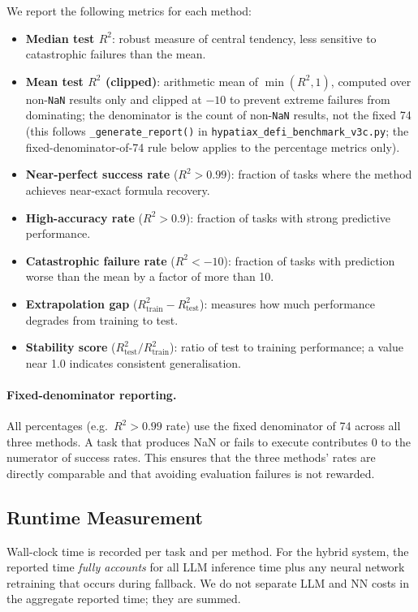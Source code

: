 \documentclass[twoside,11pt]{article}
\newcommand{\Rsq}{R^{2}}
\newcommand{\Rtrain}{R^{2}_{\mathrm{train}}}
\newcommand{\Rtest}{R^{2}_{\mathrm{test}}}
\begin{document}
We report the following metrics for each method:
\begin{itemize}
  \item \textbf{Median test $\Rsq$}: robust measure of central tendency, less
    sensitive to catastrophic failures than the mean.
  \item \textbf{Mean test $\Rsq$ (clipped)}: arithmetic mean of $\min(\Rsq, 1)$,
    computed over non-\texttt{NaN} results only and clipped at $-10$ to prevent extreme failures from
    dominating; the denominator is the count of non-\texttt{NaN} results, not the fixed 74 (this follows
    \texttt{\_generate\_report()} in \texttt{hypatiax\_defi\_benchmark\_v3c.py}; the fixed-denominator-of-74 rule below
    applies to the percentage metrics only).
  \item \textbf{Near-perfect success rate} ($\Rsq > 0.99$): fraction of tasks where
    the method achieves near-exact formula recovery.
  \item \textbf{High-accuracy rate} ($\Rsq > 0.9$): fraction of tasks with strong
    predictive performance.
  \item \textbf{Catastrophic failure rate} ($\Rsq < -10$): fraction of tasks with
    prediction worse than the mean by a factor of more than 10.
  \item \textbf{Extrapolation gap} ($\Rtrain - \Rtest$): measures how much
    performance degrades from training to test.
  \item \textbf{Stability score} ($\Rtest / \Rtrain$): ratio of test to training
    performance; a value near 1.0 indicates consistent generalisation.
\end{itemize}

\paragraph{Fixed-denominator reporting.}
All percentages (e.g.\ $\Rsq > 0.99$ rate) use the fixed denominator of 74 across
all three methods.  A task that produces NaN or fails to execute contributes 0 to
the numerator of success rates.  This ensures that the three methods' rates are
directly comparable and that avoiding evaluation failures is not rewarded.

\subsection{Runtime Measurement}\label{subsec:runtime-measurement}
\label{sec:timing_setup}

Wall-clock time is recorded per task and per method.  For the hybrid system,
the reported time \emph{fully accounts} for all LLM inference time plus any
neural network retraining that occurs during fallback.  We do not separate
LLM and NN costs in the aggregate reported time; they are summed.
\end{document}

